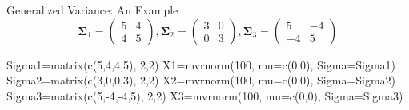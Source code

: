 \documentclass[
  ignorenonframetext,
]{beamer}
\newenvironment{Shaded}{\begin{snugshade}}{\end{snugshade}}
\newcommand{\AttributeTok}[1]{\textcolor[rgb]{0.77,0.63,0.00}{#1}}
\newcommand{\DecValTok}[1]{\textcolor[rgb]{0.00,0.00,0.81}{#1}}
\newcommand{\FunctionTok}[1]{\textcolor[rgb]{0.00,0.00,0.00}{#1}}
\newcommand{\NormalTok}[1]{#1}
\newcommand{\OtherTok}[1]{\textcolor[rgb]{0.56,0.35,0.01}{#1}}
\newcommand{\SpecialCharTok}[1]{\textcolor[rgb]{0.00,0.00,0.00}{#1}}
\begin{document}
\begin{frame}[fragile]{Generalized Variance: An Example}
\protect\hypertarget{generalized-variance-an-example}{}
\[
\boldsymbol \Sigma_1=\begin{pmatrix}5 &4 \\ 4 &5\end{pmatrix},
\boldsymbol \Sigma_2=\begin{pmatrix}3 &0 \\ 0 &3\end{pmatrix},
\boldsymbol \Sigma_3=\begin{pmatrix}5 &-4 \\ -4 &5\end{pmatrix}
\]

\begin{Shaded}
\begin{Highlighting}[]
\NormalTok{Sigma1}\OtherTok{=}\FunctionTok{matrix}\NormalTok{(}\FunctionTok{c}\NormalTok{(}\DecValTok{5}\NormalTok{,}\DecValTok{4}\NormalTok{,}\DecValTok{4}\NormalTok{,}\DecValTok{5}\NormalTok{), }\DecValTok{2}\NormalTok{,}\DecValTok{2}\NormalTok{) }
\NormalTok{X1}\OtherTok{=}\FunctionTok{mvrnorm}\NormalTok{(}\DecValTok{100}\NormalTok{, }\AttributeTok{mu=}\FunctionTok{c}\NormalTok{(}\DecValTok{0}\NormalTok{,}\DecValTok{0}\NormalTok{), }\AttributeTok{Sigma=}\NormalTok{Sigma1)}
\NormalTok{Sigma2}\OtherTok{=}\FunctionTok{matrix}\NormalTok{(}\FunctionTok{c}\NormalTok{(}\DecValTok{3}\NormalTok{,}\DecValTok{0}\NormalTok{,}\DecValTok{0}\NormalTok{,}\DecValTok{3}\NormalTok{), }\DecValTok{2}\NormalTok{,}\DecValTok{2}\NormalTok{)}
\NormalTok{X2}\OtherTok{=}\FunctionTok{mvrnorm}\NormalTok{(}\DecValTok{100}\NormalTok{, }\AttributeTok{mu=}\FunctionTok{c}\NormalTok{(}\DecValTok{0}\NormalTok{,}\DecValTok{0}\NormalTok{), }\AttributeTok{Sigma=}\NormalTok{Sigma2)}
\NormalTok{Sigma3}\OtherTok{=}\FunctionTok{matrix}\NormalTok{(}\FunctionTok{c}\NormalTok{(}\DecValTok{5}\NormalTok{,}\SpecialCharTok{{-}}\DecValTok{4}\NormalTok{,}\SpecialCharTok{{-}}\DecValTok{4}\NormalTok{,}\DecValTok{5}\NormalTok{), }\DecValTok{2}\NormalTok{,}\DecValTok{2}\NormalTok{)}
\NormalTok{X3}\OtherTok{=}\FunctionTok{mvrnorm}\NormalTok{(}\DecValTok{100}\NormalTok{, }\AttributeTok{mu=}\FunctionTok{c}\NormalTok{(}\DecValTok{0}\NormalTok{,}\DecValTok{0}\NormalTok{), }\AttributeTok{Sigma=}\NormalTok{Sigma3)}
\end{Highlighting}
\end{Shaded}
\end{frame}
\end{document}
